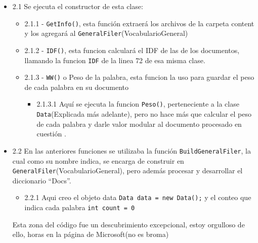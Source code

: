 \begin{enumerate}
  \begin{itemize}
  \tightlist
  \item
    2.1 Se ejecuta el constructor de esta clase:

    \begin{itemize}
    \tightlist
    \item
      2.1.1 - \texttt{GetInfo()}, esta función extraerá los archivos de
      la carpeta content y los agregará al
      \texttt{GeneralFiler}(VocabularioGeneral)
    \item
      2.1.2 - \texttt{IDF()}, esta funcion calculará el IDF de las de
      los documentos, llamando la funcion \texttt{IDF} de la linea 72 de
      esa misma clase.
    \item
      2.1.3 - \texttt{WW()} o Peso de la palabra, esta funcion la uso
      para guardar el peso de cada palabra en su documento

      \begin{itemize}
      \tightlist
      \item
        2.1.3.1 Aquí se ejecuta la funcion \texttt{Peso()},
        perteneciente a la clase \texttt{Data}(Explicada más adelante),
        pero no hace más que calcular el peso de cada palabra y darle
        valor modular al documento procesado en cuestión .
      \end{itemize}
    \end{itemize}
  \item
    2.2 En las anteriores funciones se utilizaba la función
    \texttt{BuildGeneralFiler}, la cual como su nombre indica, se
    encarga de construir en \texttt{GeneralFiler}(VocabularioGeneral),
    pero además procesar y desarrollar el diccionario ``Docs''.

    \begin{itemize}
    \tightlist
    \item
      2.2.1 Aqui creo el objeto data
      \texttt{Data\ data\ =\ new\ Data();} y el conteo que indica cada
      palabra \texttt{int\ count\ =\ 0}
    \end{itemize}

    Esta zona del código fue un descubrimiento excepcional, estoy
    orgulloso de ello, horas en la página de Microsoft(no es broma)
  \end{itemize}

\begin{Shaded}
\begin{Highlighting}[]
      \OperatorTok{(}\OperatorTok{,} \OperatorTok{)\{}   
\OperatorTok{=}  \OperatorTok{();}
    \OperatorTok{=} \OperatorTok{;} 


\end{Highlighting}
\end{Shaded}
\end{enumerate}
